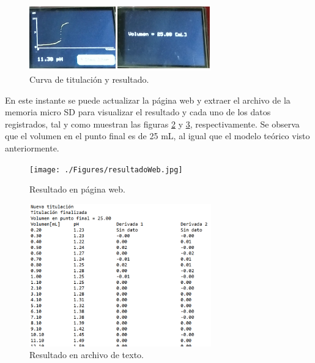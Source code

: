 \begin{figure}[htbp]
	\centering
	\includegraphics[width=0.7\textwidth]{./Figures/casoParte3.png}
	\caption{Curva de titulación y resultado.}
	\label{fig:casoParte3}
\end{figure}

En este instante se puede actualizar la página web y extraer el archivo de la memoria micro SD para visualizar el resultado y cada uno de los datos registrados, tal y como muestran las figuras \ref{fig:resultadoWeb.jpg} y \ref{fig:resultadoSD}, respectivamente. Se observa que el volumen en el punto final es de 25 mL, al igual que el modelo teórico visto anteriormente.

\begin{figure}[htbp]
	\centering
	\texttt{[image: ./Figures/resultadoWeb.jpg]}
	\caption{Resultado en página web.}
	\label{fig:resultadoWeb.jpg}
\end{figure}

\begin{figure}[htbp]
	\centering
	\includegraphics[width=0.7\textwidth]{./Figures/resultadoSD.png}
	\caption{Resultado en archivo de texto.}
	\label{fig:resultadoSD}
\end{figure}


